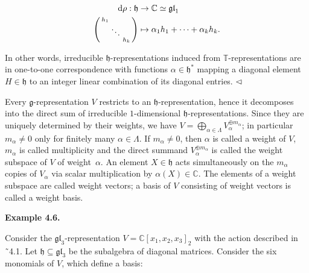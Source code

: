 \documentclass[10pt,a4paper]{article}
\begin{document}
\[\begin{aligned}
\displaystyle\textnormal{d}\rho:\mathfrak{h} & \displaystyle\to\mathbb{C}\simeq\mathfrak{gl}_{1} \\
\displaystyle\left(\begin{smallmatrix}h_{1}&&\\ &\ddots&\\ &&h_{k}\end{smallmatrix}\right) & \displaystyle\mapsto\alpha_{1}h_{1}+\cdots+\alpha_{k}h_{k}.
\end{aligned}\]


In other words, irreducible $\mathfrak{h}$-representations induced from $\mathbb{T}$-representations are in one-to-one correspondence with functions $\alpha\in\mathfrak{h}^{*}$ mapping a diagonal element $H\in\mathfrak{h}$ to an integer linear combination of its diagonal entries. $\hfill\vartriangleleft$





Every $\mathfrak{g}$-representation $V$ restricts to an $\mathfrak{h}$-representation, hence it decomposes into the direct sum of irreducible $1$-dimensional $\mathfrak{h}$-representations. Since they are uniquely determined by their weights, we have $V=\bigoplus_{\alpha\in\Lambda}V_{\alpha}^{\oplus m_{\alpha}}$; in particular $m_{\alpha}\neq 0$ only for finitely many $\alpha\in\Lambda$. If $m_{\alpha}\neq 0$, then $\alpha$ is called a weight of $V$, $m_{\alpha}$ is called multiplicity and the direct summand $V_{\alpha}^{\oplus m_{\alpha}}$ is called the weight subspace of $V$ of weight $\alpha$. An element $X\in\mathfrak{h}$ acts simultaneously on the $m_{\alpha}$ copies of $V_{\alpha}$ via scalar multiplication by $\alpha(X)\in\mathbb{C}$. The elements of a weight subspace are called weight vectors; a basis of $V$ consisting of weight vectors is called a weight basis.





\par\medskip\noindent\textbf{Example 4.6.}\par



Consider the $\mathfrak{gl}_{3}$-representation $V=\mathbb{C}[x_{1},x_{2},x_{3}]_{2}$ with the action described in ˜4.1. Let $\mathfrak{h}\subseteq\mathfrak{gl}_{3}$ be the subalgebra of diagonal matrices.
Consider the six monomials of $V$, which define a basis:
\end{document}
